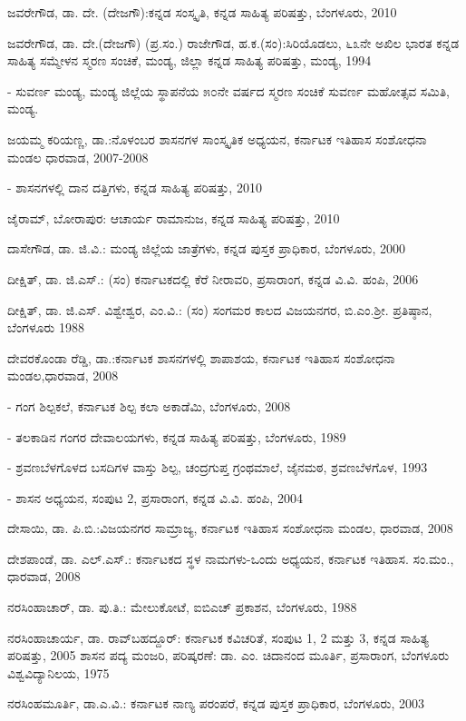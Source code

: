 \noindent
ಜವರೇಗೌಡ, ಡಾ. ದೇ. (ದೇಜಗೌ):ಕನ್ನಡ ಸಂಸ್ಕೃತಿ, ಕನ್ನಡ ಸಾಹಿತ್ಯ ಪರಿಷತ್ತು, ಬೆಂಗಳೂರು, 2010

\noindent
ಜವರೇಗೌಡ, ಡಾ. ದೇ.(ದೇಜಗೌ) (ಪ್ರ.ಸಂ.) ರಾಜೇಗೌಡ, ಹ.ಕ.(ಸಂ):ಸಿರಿಯೊಡಲು, ೬೩ನೇ ಅಖಿಲ ಭಾರತ ಕನ್ನಡ ಸಾಹಿತ್ಯ ಸಮ್ಮೇಳನ ಸ್ಮರಣ ಸಂಚಿಕೆ, ಮಂಡ್ಯ, ಜಿಲ್ಲಾ ಕನ್ನಡ ಸಾಹಿತ್ಯ ಪರಿಷತ್ತು, ಮಂಡ್ಯ, 1994

- ಸುವರ್ಣ ಮಂಡ್ಯ, ಮಂಡ್ಯ ಜಿಲ್ಲೆಯ ಸ್ಥಾಪನೆಯ ೫೦ನೇ ವರ್ಷದ ಸ್ಮರಣ ಸಂಚಿಕೆ ಸುವರ್ಣ ಮಹೋತ್ಸವ ಸಮಿತಿ, ಮಂಡ್ಯ.

\noindent
ಜಯಮ್ಮ ಕರಿಯಣ್ಣ, ಡಾ.:ನೊಳಂಬರ ಶಾಸನಗಳ ಸಾಂಸ್ಕೃತಿಕ ಅಧ್ಯಯನ, ಕರ್ನಾಟಕ ಇತಿಹಾಸ ಸಂಶೋಧನಾ ಮಂಡಲ ಧಾರವಾಡ, 2007-2008

- ಶಾಸನಗಳಲ್ಲಿ ದಾನ ದತ್ತಿಗಳು, ಕನ್ನಡ ಸಾಹಿತ್ಯ ಪರಿಷತ್ತು, 2010

\noindent
ಜೈರಾಮ್, ಬೋರಾಪುರ: ಆಚಾರ್ಯ ರಾಮಾನುಜ, ಕನ್ನಡ ಸಾಹಿತ್ಯ ಪರಿಷತ್ತು, 2010

\noindent
ದಾಸೇಗೌಡ, ಡಾ. ಜಿ.ವಿ.: ಮಂಡ್ಯ ಜಿಲ್ಲೆಯ ಜಾತ್ರೆಗಳು, ಕನ್ನಡ ಪುಸ್ತಕ ಪ್ರಾಧಿಕಾರ, ಬೆಂಗಳೂರು, 2000

\noindent
ದೀಕ್ಷಿತ್​, ಡಾ. ಜಿ.ಎಸ್​.: (ಸಂ) ಕರ್ನಾಟಕದಲ್ಲಿ ಕೆರೆ ನೀರಾವರಿ, ಪ್ರಸಾರಾಂಗ, ಕನ್ನಡ ವಿ.ವಿ. ಹಂಪಿ, 2006

\noindent
ದೀಕ್ಷಿತ್​, ಡಾ. ಜಿ.ಎಸ್​. ವಿಶ್ವೇಶ್ವರ, ಎಂ.ವಿ.: (ಸಂ) ಸಂಗಮರ ಕಾಲದ ವಿಜಯನಗರ, ಬಿ.ಎಂ.ಶ‍್ರೀ. ಪ್ರತಿಷ್ಠಾನ, ಬೆಂಗಳೂರು 1988

\noindent
ದೇವರಕೊಂಡಾ ರೆಡ್ಡಿ, ಡಾ.:ಕರ್ನಾಟಕ ಶಾಸನಗಳಲ್ಲಿ ಶಾಪಾಶಯ, ಕರ್ನಾಟಕ ಇತಿಹಾಸ ಸಂಶೋಧನಾ ಮಂಡಲ,ಧಾರವಾಡ, 2008

- ಗಂಗ ಶಿಲ್ಪಕಲೆ, ಕರ್ನಾಟಕ ಶಿಲ್ಪ ಕಲಾ ಅಕಾಡೆಮಿ, ಬೆಂಗಳೂರು, 2008

- ತಲಕಾಡಿನ ಗಂಗರ ದೇವಾಲಯಗಳು, ಕನ್ನಡ ಸಾಹಿತ್ಯ ಪರಿಷತ್ತು, ಬೆಂಗಳೂರು, 1989

- ಶ್ರವಣಬೆಳಗೊಳದ ಬಸದಿಗಳ ವಾಸ್ತು ಶಿಲ್ಪ, ಚಂದ್ರಗುಪ್ತ ಗ್ರಂಥಮಾಲೆ, ಜೈನಮಠ, ಶ್ರವಣಬೆಳಗೊಳ, 1993

- ಶಾಸನ ಅಧ್ಯಯನ, ಸಂಪುಟ 2, ಪ್ರಸಾರಾಂಗ, ಕನ್ನಡ ವಿ.ವಿ. ಹಂಪಿ, 2004

\noindent
ದೇಸಾಯಿ, ಡಾ. ಪಿ.ಬಿ.:ವಿಜಯನಗರ ಸಾಮ್ರಾಜ್ಯ, ಕರ್ನಾಟಕ ಇತಿಹಾಸ ಸಂಶೋಧನಾ ಮಂಡಲ, ಧಾರವಾಡ, 2008

\noindent
ದೇಶಪಾಂಡೆ, ಡಾ. ಎಲ್​.ಎಸ್​.: ಕರ್ನಾಟಕದ ಸ್ಥಳ ನಾಮಗಳು-ಒಂದು ಅಧ್ಯಯನ, ಕರ್ನಾಟಕ ಇತಿಹಾಸ. ಸಂ.ಮಂ., ಧಾರವಾಡ, 2008

\noindent
ನರಸಿಂಹಾಚಾರ್​, ಡಾ. ಪು.ತಿ.: ಮೇಲುಕೋಟೆ, ಐಬಿಎಚ್​ ಪ್ರಕಾಶನ, ಬೆಂಗಳೂರು, 1988

\noindent
ನರಸಿಂಹಾಚಾರ್ಯ, ಡಾ. ರಾವ್​ಬಹದ್ದೂರ್​: ಕರ್ನಾಟಕ ಕವಿಚರಿತೆ, ಸಂಪುಟ 1, 2 ಮತ್ತು 3, ಕನ್ನಡ ಸಾಹಿತ್ಯ ಪರಿಷತ್ತು, 2005 ಶಾಸನ ಪದ್ಯ ಮಂಜರಿ, ಪರಿಷ್ಕರಣೆ: ಡಾ. ಎಂ. ಚಿದಾನಂದ ಮೂರ್ತಿ, ಪ್ರಸಾರಾಂಗ, ಬೆಂಗಳೂರು ವಿಶ್ವವಿದ್ಯಾನಿಲಯ, 1975

\noindent
ನರಸಿಂಹಮೂರ್ತಿ, ಡಾ.ಎ.ವಿ.: ಕರ್ನಾಟಕ ನಾಣ್ಯ ಪರಂಪರೆ, ಕನ್ನಡ ಪುಸ್ತಕ ಪ್ರಾಧಿಕಾರ, ಬೆಂಗಳೂರು, 2003

